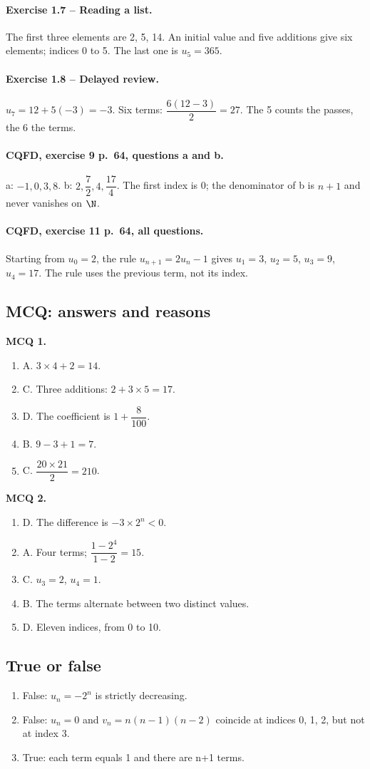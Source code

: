 \paragraph{Exercise 1.7 -- Reading a list.} The first three elements are 2, 5, 14. An initial value and five additions give six elements; indices 0 to 5. The last one is $u_5=365$.
\paragraph{Exercise 1.8 -- Delayed review.} $u_7=12+5(-3)=-3$. Six terms: $\dfrac{6(12-3)}{2}=27$. The 5 counts the passes, the 6 the terms.
\paragraph{CQFD, exercise 9 p.~64, questions a and b.} a: $-1,0,3,8$. b: $2,\dfrac72,4,\dfrac{17}4$. The first index is 0; the denominator of b is $n+1$ and never vanishes on $\N$.
\paragraph{CQFD, exercise 11 p.~64, all questions.} Starting from $u_0=2$, the rule $u_{n+1}=2u_n-1$ gives $u_1=3$, $u_2=5$, $u_3=9$, $u_4=17$. The rule uses the previous term, not its index.
\subsection*{MCQ: answers and reasons}
\textbf{MCQ 1.}
\begin{enumerate}
\item A. $3\times4+2=14$.
\item C. Three additions: $2+3\times5=17$.
\item D. The coefficient is $1+\dfrac{8}{100}$.
\item B. $9-3+1=7$.
\item C. $\dfrac{20\times 21}{2}=210$.
\end{enumerate}
\textbf{MCQ 2.}
\begin{enumerate}
\item D. The difference is $-3\times2^n<0$.
\item A. Four terms; $\dfrac{1-2^4}{1-2}=15$.
\item C. $u_3=2$, $u_4=1$.
\item B. The terms alternate between two distinct values.
\item D. Eleven indices, from 0 to 10.
\end{enumerate}
\subsection*{True or false}
\begin{enumerate}
\item False: $u_n=-2^n$ is strictly decreasing.
\item False: $u_n=0$ and $v_n=n(n-1)(n-2)$ coincide at indices 0, 1, 2, but not at index 3.
\item True: each term equals 1 and there are n+1 terms.
\end{enumerate}
